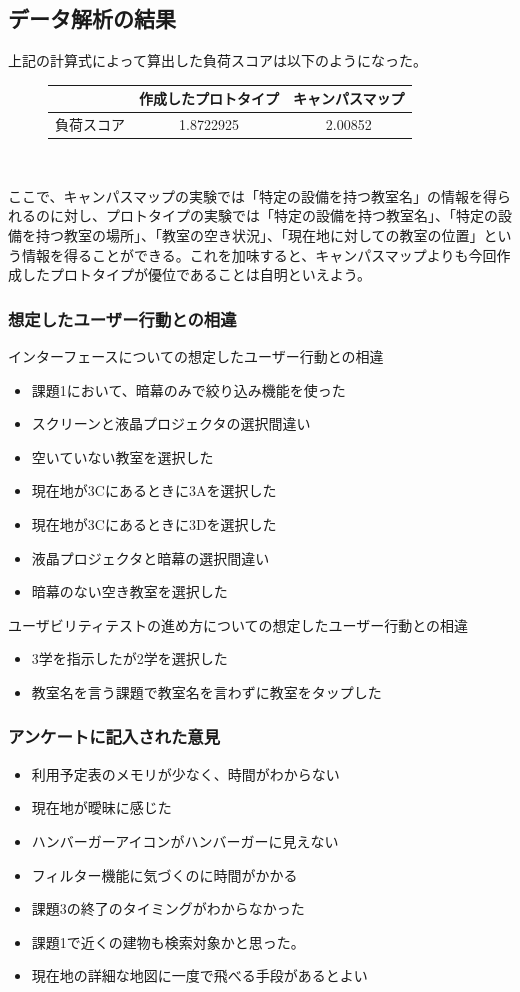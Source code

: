 \documentclass[12pt,a4paper,dvipdf]{jsarticle}
\begin{document}
\subsection{データ解析の結果}
上記の計算式によって算出した負荷スコアは以下のようになった。
\begin{figure}[H]
    \centering
    \begin{tabular}{c|cc}
              & 作成したプロトタイプ & キャンパスマップ \\
        \hline
        負荷スコア & 1.8722925  & 2.00852
    \end{tabular}\\
\end{figure}
ここで、キャンパスマップの実験では「特定の設備を持つ教室名」の情報を得られるのに対し、プロトタイプの実験では「特定の設備を持つ教室名」、「特定の設備を持つ教室の場所」、「教室の空き状況」、「現在地に対しての教室の位置」という情報を得ることができる。これを加味すると、キャンパスマップよりも今回作成したプロトタイプが優位であることは自明といえよう。
\subsubsection{想定したユーザー行動との相違}
インターフェースについての想定したユーザー行動との相違
\begin{itemize}
    \item 課題1において、暗幕のみで絞り込み機能を使った
    \item スクリーンと液晶プロジェクタの選択間違い
    \item 空いていない教室を選択した
    \item 現在地が3Cにあるときに3Aを選択した
    \item 現在地が3Cにあるときに3Dを選択した
    \item 液晶プロジェクタと暗幕の選択間違い
    \item 暗幕のない空き教室を選択した
\end{itemize}
ユーザビリティテストの進め方についての想定したユーザー行動との相違
\begin{itemize}
    \item 3学を指示したが2学を選択した
    \item 教室名を言う課題で教室名を言わずに教室をタップした
\end{itemize}

\subsubsection{アンケートに記入された意見}
\begin{itemize}
    \item 利用予定表のメモリが少なく、時間がわからない
    \item 現在地が曖昧に感じた
    \item ハンバーガーアイコンがハンバーガーに見えない
    \item フィルター機能に気づくのに時間がかかる
    \item 課題3の終了のタイミングがわからなかった
    \item 課題1で近くの建物も検索対象かと思った。
    \item 現在地の詳細な地図に一度で飛べる手段があるとよい
\end{itemize}
\end{document}
